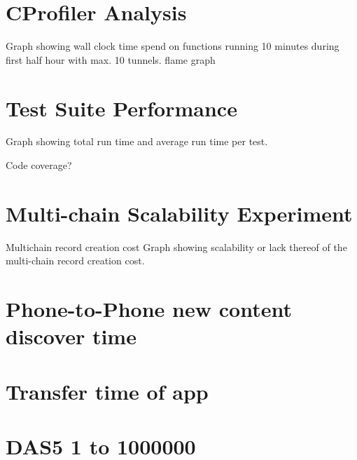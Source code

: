 \section{CProfiler Analysis}
Graph showing wall clock time spend on functions running 10 minutes during first half hour with max. 10 tunnels.
flame graph

\section{Test Suite Performance}
Graph showing total run time and average run time per test.

Code coverage?

\section{Multi-chain Scalability Experiment}
Multichain record creation cost
Graph showing scalability or lack thereof of the multi-chain record creation cost.


\section{Phone-to-Phone new content discover time}



\section{Transfer time of app}



\section{DAS5 1 to 1000000} 


